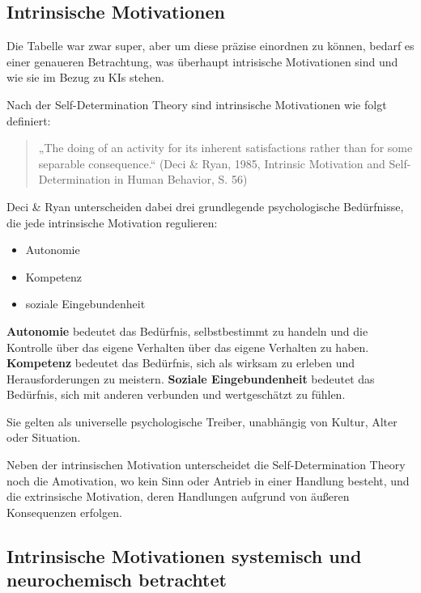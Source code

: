 \subsection*{Intrinsische Motivationen}

Die Tabelle war zwar super, aber um diese präzise einordnen zu können, bedarf es einer genaueren Betrachtung, was überhaupt intrisische Motivationen sind und wie sie im Bezug zu KIs stehen.

Nach der Self-Determination Theory sind intrinsische Motivationen wie folgt definiert:

\begin{quotation}
	„The doing of an activity for its inherent satisfactions rather than for some separable consequence.“
(Deci \& Ryan, 1985, Intrinsic Motivation and Self-Determination in Human Behavior, S. 56)
\end{quotation}

Deci \& Ryan unterscheiden dabei drei grundlegende psychologische Bedürfnisse, die jede intrinsische Motivation regulieren:

\begin{itemize}
  \item Autonomie
  \item Kompetenz
  \item soziale Eingebundenheit
\end{itemize}

\textbf{Autonomie} bedeutet das Bedürfnis, selbstbestimmt zu handeln und die Kontrolle über das eigene Verhalten über das eigene Verhalten zu haben.
\textbf{Kompetenz} bedeutet das Bedürfnis, sich als wirksam zu erleben und Herausforderungen zu meistern.
\textbf{Soziale Eingebundenheit} bedeutet das Bedürfnis, sich mit anderen verbunden und wertgeschätzt zu fühlen.

Sie gelten als universelle psychologische Treiber, unabhängig von Kultur, Alter oder Situation.

Neben der intrinsischen Motivation unterscheidet die Self-Determination Theory noch die Amotivation, wo kein Sinn oder Antrieb in einer Handlung besteht, und die extrinsische Motivation, deren Handlungen aufgrund von äußeren Konsequenzen erfolgen.



\subsection*{Intrinsische Motivationen systemisch und neurochemisch betrachtet}

